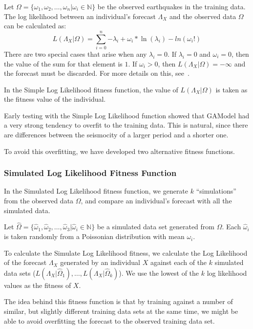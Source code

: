 \documentclass{sig-alternate}
\begin{document}
Let $\Omega = \{\omega_1, \omega_2, \dots, \omega_n | \omega_i \in
\mathbb{N}\}$ be the observed earthquakes in the training data. The
log likelihood between an individual's forecast $\Lambda_X$ and the
observed data $\Omega$ can be calculated as:
\begin{equation}
  L(\Lambda_X|\Omega) = \sum_{i=0}^n {-\lambda_i +
    \omega_i*\ln(\lambda_i)-ln(\omega_i!)}
\end{equation}
There are two special cases that arise when any $\lambda_i = 0$. If
$\lambda_i = 0$ and $\omega_i = 0$, then the value of the sum for that
element is $1$. If $\omega_i > 0$, then $L(\Lambda_X|\Omega) =
-\infty$ and the forecast must be discarded. For more details on
this, see~\cite{Schorlemmer2007}.

In the Simple Log Likelihood fitness function, the value of
$L(\Lambda_X|\Omega)$ is taken as the fitness value of the individual.

Early testing with the Simple Log Likelihood function showed that
GAModel had a very strong tendency to overfit to the training
data. This is natural, since there are differences between the
seismocity of a larger period and a shorter one. 

To avoid this overfitting, we have developed two alternative fitness
functions.

\subsubsection{Simulated Log Likelihood Fitness Function}

In the Simulated Log Likelihood fitness function, we generate $k$
``simulations'' from the observed data $\Omega$, and compare an
individual's forecast with all the simulated data.

Let $\hat\Omega =
\{\hat\omega_1,\hat\omega_2,\dots,\hat\omega_3
|\hat\omega_i\in\mathbb{N}\}$ be a simulated data set generated from
$\Omega$. Each $\hat\omega_i$ is taken randomly from a Poissonian
distribution with mean $\omega_i$.

To calculate the Simulate Log Likelihood fitness, we calculate the Log
Likelihood of the forecast $\Lambda_X$ generated by an individual $X$
against each of the $k$ simulated data sets
($L(\Lambda_X|\hat\Omega_1), \dots, L(\Lambda_X|\hat\Omega_k)$). We
use the lowest of the $k$ log likelihood values as the fitness of $X$.

The idea behind this fitness function is that by training against a
number of similar, but slightly different training data sets at the
same time, we might be able to avoid overfitting the forecast to the
observed training data set.
\end{document}
